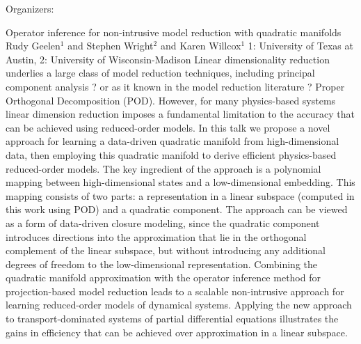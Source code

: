 \label{mini16}

\miniabs
{}
{Organizers: }
{}

\vspace{2ex}
\abs
{Operator inference for non-intrusive model reduction with quadratic manifolds}
{Rudy Geelen$^{1}$ and Stephen Wright$^{2}$ and Karen Willcox$^{1}$}
{1: University of Texas at Austin, 2: University of Wisconsin-Madison}
{Linear dimensionality reduction underlies a large class of model reduction techniques, including principal component analysis ? or as it known in the model reduction literature ? Proper Orthogonal Decomposition (POD). However, for many physics-based systems linear dimension reduction imposes a fundamental limitation to the accuracy that can be achieved using reduced-order models. In this talk we propose a novel approach for learning a data-driven quadratic manifold from high-dimensional data, then employing this quadratic manifold to derive efficient physics-based reduced-order models. The key ingredient of the approach is a polynomial mapping between high-dimensional states and a low-dimensional embedding. This mapping consists of two parts: a representation in a linear subspace (computed in this work using POD) and a quadratic component. The approach can be viewed as a form of data-driven closure modeling, since the quadratic component introduces directions into the approximation that lie in the orthogonal complement of the linear subspace, but without introducing any additional degrees of freedom to the low-dimensional representation. Combining the quadratic manifold approximation with the operator inference method for projection-based model reduction leads to a scalable non-intrusive approach for learning reduced-order models of dynamical systems. Applying the new approach to transport-dominated systems of partial differential equations illustrates the gains in efficiency that can be achieved over approximation in a linear subspace.}


